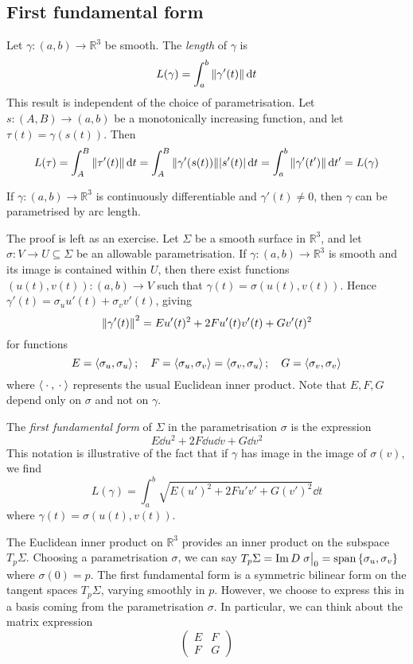 \subsection{First fundamental form}
Let \( \gamma \colon (a,b) \to \mathbb R^3 \) be smooth.
The \textit{length} of \( \gamma \) is
\[
	L(\gamma) = \int_a^b \norm{\gamma'(t)} \dd{t}
\]
This result is independent of the choice of parametrisation.
Let \( s \colon (A,B) \to (a,b) \) be a monotonically increasing function, and let \( \tau(t) = \gamma(s(t)) \).
Then
\[
	L(\tau) = \int_A^B \norm{\tau'(t)} \dd{t} = \int_A^B \norm{\gamma'(s(t))} \abs{s'(t)} \dd{t} = \int_a^b \norm{\gamma'(t')} \dd{t'} = L(\gamma)
\]
\begin{lemma}
	If \( \gamma \colon (a,b) \to \mathbb R^3 \) is continuously differentiable and \( \gamma'(t) \neq 0 \), then \( \gamma \) can be parametrised by arc length.
\end{lemma}
The proof is left as an exercise.
Let \( \Sigma \) be a smooth surface in \( \mathbb R^3 \), and let \( \sigma \colon V \to U \subseteq \Sigma \) be an allowable parametrisation.
If \( \gamma \colon (a,b) \to \mathbb R^3 \) is smooth and its image is contained within \( U \), then there exist functions \( (u(t), v(t)) \colon (a,b) \to V \) such that \( \gamma(t) = \sigma(u(t), v(t)) \).
Hence \( \gamma'(t) = \sigma_u u'(t) + \sigma_v v'(t) \), giving
\[
	\norm{\gamma'(t)}^2 = E u'(t)^2 + 2F u'(t) v'(t) + G v'(t)^2
\]
for functions
\[
	E = \left\langle{\sigma_u, \sigma_u}\right\rangle;\quad F = \left\langle{\sigma_u, \sigma_v}\right\rangle = \left\langle{\sigma_v, \sigma_u}\right\rangle;\quad G = \left\langle{\sigma_v, \sigma_v}\right\rangle
\]
where \( \left\langle{{}\cdot{},{}\cdot{}}\right\rangle \) represents the usual Euclidean inner product.
Note that \( E, F, G \) depend only on \( \sigma \) and not on \( \gamma \).
\begin{definition}
	The \textit{first fundamental form} of \( \Sigma \) in the parametrisation \( \sigma \) is the expression
	\[
		E \dd{u}^2 + 2F \dd{u} \dd{v} + G \dd{v}^2
	\]
	This notation is illustrative of the fact that if \( \gamma \) has image in the image of \( \sigma(v) \), we find
	\[
		L(\gamma) = \int_a^b \sqrt{E (u')^2 + 2F u'v' + G (v')^2} \dd{t}
	\]
	where \( \gamma(t) = \sigma(u(t),v(t)) \).
\end{definition}
\begin{remark}
	The Euclidean inner product on \( \mathbb R^3 \) provides an inner product on the subspace \( T_p \Sigma \).
	Choosing a parametrisation \( \sigma \), we can say \( T_p \Sigma = \Im D \eval{\sigma}_0 = \vecspan{\qty{\sigma_u, \sigma_v}} \) where \( \sigma(0) = p \).
	The first fundamental form is a symmetric bilinear form on the tangent spaces \( T_p \Sigma \), varying smoothly in \( p \).
	However, we choose to express this in a basis coming from the parametrisation \( \sigma \).
	In particular, we can think about the matrix expression
	\[
		\begin{pmatrix}
			E & F \\
			F & G
		\end{pmatrix}
	\]
\end{remark}
